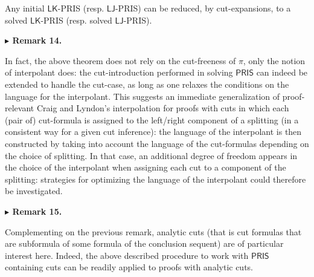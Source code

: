  
Any initial $\mathsf{LK}$-PRIS (resp. $\mathsf{LJ}$-PRIS) can be reduced, by cut-expansions, to a solved $\mathsf{LK}$-PRIS (resp. solved $\mathsf{LJ}$-PRIS).\par
 
 
 
 
\par\medskip\noindent\textbf{$\blacktriangleright$ Remark 14.}\par
 
 
In fact, the above theorem does not rely on the cut-freeness of $\pi$, only the notion of interpolant does: the cut-introduction performed in solving $\mathsf{PRIS}$ can indeed be extended to handle the cut-case, as long as one relaxes the conditions on the language for the interpolant. This suggests an immediate generalization of proof-relevant Craig and Lyndon’s interpolation for proofs with cuts in which each (pair of) cut-formula is assigned to the left/right component of a splitting (in a consistent way for a given cut inference): the language of the interpolant is then constructed by taking into account the language of the cut-formulas depending on the choice of splitting. In that case, an additional degree of freedom appears in the choice of the interpolant when assigning each cut to a component of the splitting: strategies for optimizing the language of the interpolant could therefore be investigated.\par
 
 
 
 
\par\medskip\noindent\textbf{$\blacktriangleright$ Remark 15.}\par
 
 
Complementing on the previous remark, analytic cuts (that is cut formulas that are subformula of some formula of the conclusion sequent) are of particular interest here. Indeed, the above described procedure to work with $\mathsf{PRIS}$ containing cuts can be readily applied to proofs with analytic cuts.\par
 
 
